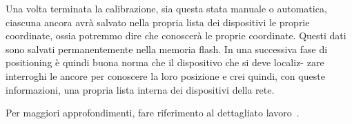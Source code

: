 Una volta terminata la calibrazione, sia questa stata manuale o automatica, ciascuna ancora avrà
salvato nella propria lista dei dispositivi le proprie coordinate, ossia potremmo dire che conoscerà le proprie coordinate. 
Questi dati sono salvati permanentemente nella memoria flash.
In una successiva fase di positioning è quindi buona norma che il dispositivo che si deve localiz-
zare interroghi le ancore per conoscere la loro posizione e crei quindi, con queste informazioni, una propria lista interna dei
dispositivi della rete.


Per maggiori approfondimenti, fare riferimento al dettagliato lavoro~\cite{ctesconistudio}.

\newpage



